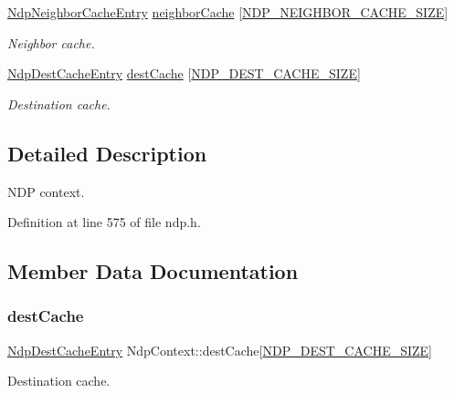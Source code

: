\begin{DoxyCompactItemize}
\hyperlink{structNdpNeighborCacheEntry}{Ndp\+Neighbor\+Cache\+Entry} \hyperlink{structNdpContext_a161aed0b6e6c3fab541a57acfbb7e229}{neighbor\+Cache} \mbox{[}\hyperlink{net__config_8h_ae64ddc051e0a2cb9f6061cdf4b6bf1a3}{N\+D\+P\+\_\+\+N\+E\+I\+G\+H\+B\+O\+R\+\_\+\+C\+A\+C\+H\+E\+\_\+\+S\+I\+ZE}\mbox{]}
\begin{DoxyCompactList}\small\item\em Neighbor cache. \end{DoxyCompactList}\item 
\hyperlink{structNdpDestCacheEntry}{Ndp\+Dest\+Cache\+Entry} \hyperlink{structNdpContext_a23945d0ea5de4110ee60c5e64e53e1b5}{dest\+Cache} \mbox{[}\hyperlink{net__config_8h_a7b0ca1a78a956c8d64de4b00b7a724aa}{N\+D\+P\+\_\+\+D\+E\+S\+T\+\_\+\+C\+A\+C\+H\+E\+\_\+\+S\+I\+ZE}\mbox{]}
\begin{DoxyCompactList}\small\item\em Destination cache. \end{DoxyCompactList}\end{DoxyCompactItemize}


\subsection{Detailed Description}
N\+DP context. 

Definition at line 575 of file ndp.\+h.



\subsection{Member Data Documentation}
\mbox{\label{structNdpContext_a23945d0ea5de4110ee60c5e64e53e1b5}} 
\subsubsection{\texorpdfstring{dest\+Cache}{destCache}}
{\footnotesize\ttfamily \hyperlink{structNdpDestCacheEntry}{Ndp\+Dest\+Cache\+Entry} Ndp\+Context\+::dest\+Cache\mbox{[}\hyperlink{net__config_8h_a7b0ca1a78a956c8d64de4b00b7a724aa}{N\+D\+P\+\_\+\+D\+E\+S\+T\+\_\+\+C\+A\+C\+H\+E\+\_\+\+S\+I\+ZE}\mbox{]}}



Destination cache. 



